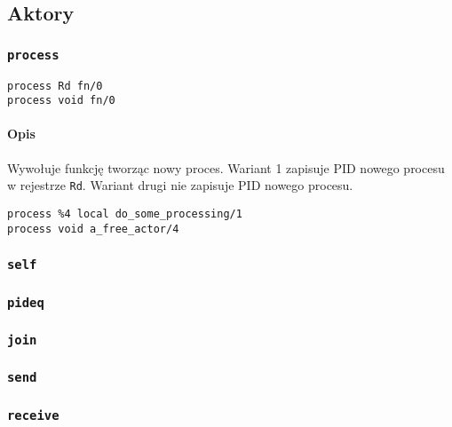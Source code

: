 \subsection{Aktory}
\label{viua_vm_ops_actor}

\subsubsection{\texttt{process}}

\begin{lstlisting}
process Rd fn/0
process void fn/0
\end{lstlisting}

\paragraph*{Opis}

Wywołuje funkcję tworząc nowy proces.
Wariant 1 zapisuje PID nowego procesu w rejestrze \texttt{Rd}.
Wariant drugi nie zapisuje PID nowego procesu.
\begin{lstlisting}
process %4 local do_some_processing/1
process void a_free_actor/4
\end{lstlisting}

\subsubsection{\texttt{self}}
\subsubsection{\texttt{pideq}}
\subsubsection{\texttt{join}}
\subsubsection{\texttt{send}}
\subsubsection{\texttt{receive}}
